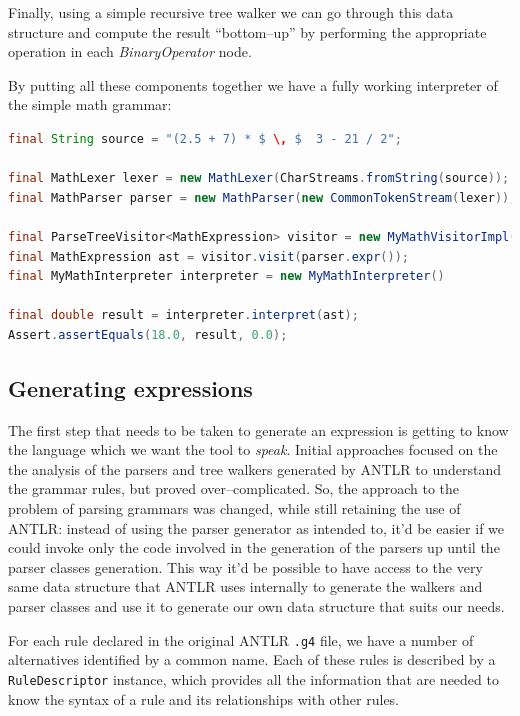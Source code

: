 \documentclass[]{usiinfbachelorproject}
\begin{document}
Finally, using a simple recursive tree walker we can go through this data
structure and compute the result ``bottom–up'' by performing the appropriate
operation in each \textit{BinaryOperator} node.

By putting all these components together we have a fully working
interpreter of the simple math grammar:

\begin{lstlisting}[caption={Java code snippet for a simple calculator app
                            made with the help of the code generated by ANTLR},
                   label={impl-parse-antlr-code},
                   language=java]
final String source = "(2.5 + 7) * $ \, $  3 - 21 / 2";

final MathLexer lexer = new MathLexer(CharStreams.fromString(source));
final MathParser parser = new MathParser(new CommonTokenStream(lexer));

final ParseTreeVisitor<MathExpression> visitor = new MyMathVisitorImpl();
final MathExpression ast = visitor.visit(parser.expr());
final MyMathInterpreter interpreter = new MyMathInterpreter()

final double result = interpreter.interpret(ast);
Assert.assertEquals(18.0, result, 0.0);
\end{lstlisting}

\subsection{Generating expressions}\label{impl-expr}

The first step that needs to be taken to generate an expression is getting
to know the language which we want the tool to \textit{speak}. Initial
approaches focused on the the analysis of the parsers and tree walkers
generated by ANTLR to understand the grammar rules, but proved over–complicated.
So, the approach to the problem of parsing grammars was changed, while still
retaining the use of ANTLR\@: instead of using the parser generator as
intended to, it'd be easier if we could invoke only the code involved in
the generation of the parsers up until the parser classes generation.
This way it'd be possible to have access to the very same data structure that
ANTLR uses internally to generate the walkers and parser classes and use it
to generate our own data structure that suits our needs.

For each rule declared in the original ANTLR \texttt{.g4} file, we have
a number of alternatives identified by a common name.
Each of these rules is described by a \texttt{RuleDescriptor} instance, which
provides all the information that are needed to know the syntax of a
rule and its relationships with other rules.
\end{document}
